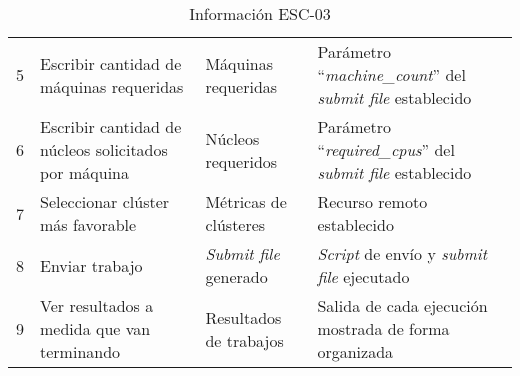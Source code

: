 \begin{table}[H]
\begin{tabular}{|p{2cm}|p{4cm}|p{2.5cm}|p{4.7cm}|}
		5 & Escribir cantidad de máquinas requeridas & Máquinas requeridas & Parámetro ``\textit{machine\_count}'' del \textit{submit file} establecido \\
		6 & Escribir cantidad de núcleos solicitados por máquina & Núcleos requeridos & Parámetro ``\textit{required\_cpus}'' del \textit{submit file} establecido \\
		7 & Seleccionar clúster más favorable & Métricas de clústeres & Recurso remoto establecido \\
		8 & Enviar trabajo & \textit{Submit file} generado & \textit{Script} de envío y \textit{submit file} ejecutado \\
		9 & Ver resultados a medida que van terminando & Resultados de trabajos & Salida de cada ejecución mostrada de forma organizada \\
		\hline
	\end{tabular}
	\caption{Información ESC-03}
	\label{table:esc-03}
\end{table}